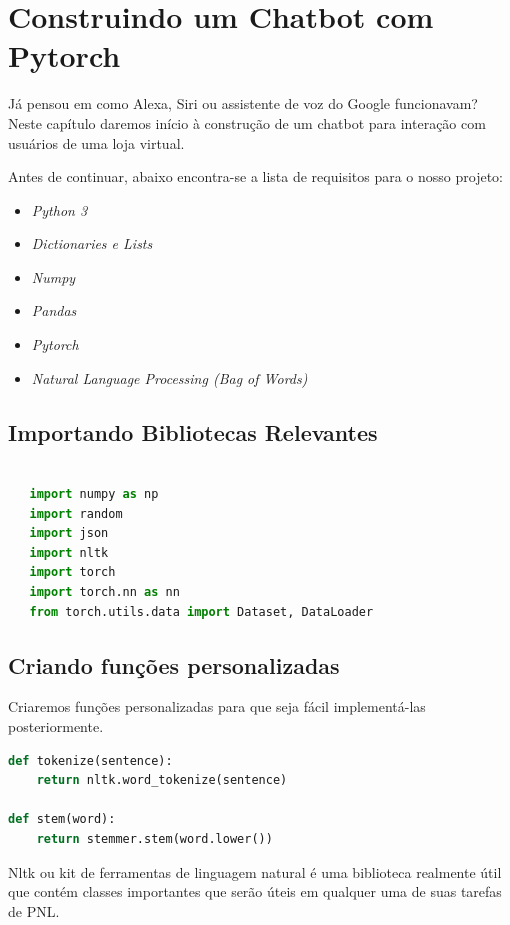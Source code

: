 \chapter[Construindo um Chatbot com Pytorch]{Construindo um Chatbot com Pytorch}

Já pensou em como Alexa, Siri ou assistente de voz do Google funcionavam? Neste capítulo daremos início à construção de um chatbot para interação com usuários de uma loja virtual.

Antes de continuar, abaixo encontra-se a lista de requisitos para o nosso projeto:
\justifying
\begin{itemize}
   \item \textit{Python 3}
   \item \textit{Dictionaries e Lists}
   \item \textit{Numpy}
   \item \textit{Pandas}
   \item \textit{Pytorch}
   \item \textit{Natural Language Processing (Bag of Words)}

\end{itemize}

\section[Importando Bibliotecas Relevantes]{Importando Bibliotecas Relevantes}
\begin{lstlisting}[language=Python, caption=Python Bibliotecas]

   import numpy as np
   import random
   import json
   import nltk
   import torch
   import torch.nn as nn
   from torch.utils.data import Dataset, DataLoader
\end{lstlisting}


\section[Criando funções personalizadas]{Criando funções personalizadas}
Criaremos funções personalizadas para que seja fácil implementá-las posteriormente.
\justifying
\begin{lstlisting}[language=Python, caption=Python Funções personalizadas]
def tokenize(sentence):
    return nltk.word_tokenize(sentence)

def stem(word):
    return stemmer.stem(word.lower())

\end{lstlisting}
Nltk ou kit de ferramentas de linguagem natural é uma biblioteca realmente útil que contém classes importantes que serão úteis em qualquer uma de suas tarefas de PNL.
\justifying
